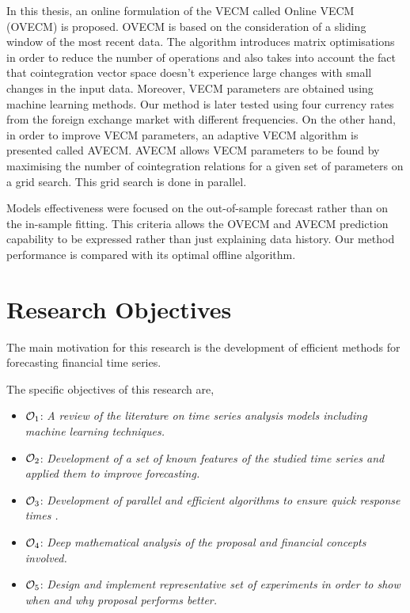 In this thesis, an online formulation of the VECM called Online VECM
(OVECM) is proposed. OVECM is based on the consideration of a sliding window of the most recent data.
The algorithm introduces matrix optimisations in order to reduce the number of
operations and also takes into account the fact that cointegration vector space
doesn't experience large changes with small changes in the input data. Moreover, VECM parameters are obtained using machine learning methods. Our method is later tested using four
currency rates from the foreign exchange market with different frequencies.  
On the other hand, in order to improve VECM parameters, an adaptive VECM algorithm is presented called AVECM. AVECM allows VECM parameters to be found by maximising the number of cointegration relations for a given set of parameters on a grid search. This grid search is done in parallel.

Models effectiveness were focused on the out-of-sample forecast rather than on the in-sample fitting. This criteria allows the OVECM and AVECM prediction capability to be expressed rather than just explaining data history. Our method performance is compared with its optimal offline algorithm.


\section{Research Objectives}
The main motivation for this research is the development of efficient methods for
forecasting financial time series.

The specific objectives of this research are,
\begin{itemize}
\item $\Large \mathcal{O}_1$: \emph{A review of the literature on time series
analysis models including machine learning techniques.}
\item $\Large \mathcal{O}_2$: \emph{Development of a set of known features of the
studied time series and applied them to improve forecasting.}
\item $\Large \mathcal{O}_3$: \emph{Development of parallel and efficient
algorithms to ensure quick response times .}
\item $\Large \mathcal{O}_4$: \emph{Deep mathematical analysis of the proposal
and financial concepts involved.}
\item $\Large \mathcal{O}_5$: \emph{Design and implement representative set of
experiments in order to show when and why proposal performs better.}
\end{itemize}



